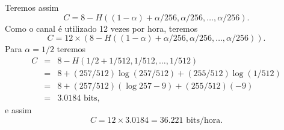 \begin{questions}
\begin{solution}
\begin{parts}
  Teremos assim
  \begin{equation}
  C = 8 - H\left( (1-\alpha) + \alpha / 256, \alpha / 256, \ldots, \alpha / 256 \right).
  \end{equation}
  Como o canal é utilizado 12 vezes por hora, teremos
  \begin{equation}
  C = 12 \times \left( 8 - H\left( (1-\alpha) + \alpha / 256, \alpha / 256, \ldots, \alpha / 256 \right) \right).
  \end{equation}
  Para $\alpha = 1/2$ teremos
  \begin{eqnarray}
  C &=& 8 - H\left( 1/2 + 1/512, 1/512, \ldots, 1/512 \right) \nonumber \\
    &=& 8 + (257/512) \log (257/512) + (255/512) \log (1/512) \nonumber \\
    &=& 8 + (257/512) (\log 257 - 9) + (255/512) (-9) \nonumber \\
    &=& 3.0184 \text{ bits,}
  \end{eqnarray}
  e assim
  \begin{equation}
  C = 12 \times 3.0184 = 36.221 \text{ bits/hora.}
  \end{equation}

\end{parts}
\end{solution}
\end{questions}

